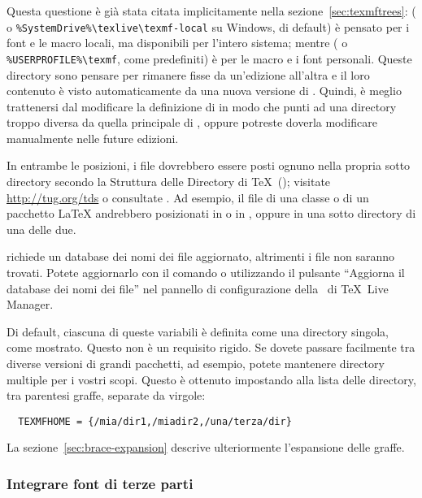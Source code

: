 \documentclass{article}
\begin{document}
Questa questione è già stata citata implicitamente nella
sezione~\ref{sec:texmftrees}:
 ( o
\verb|%SystemDrive%\texlive\texmf-local| su Windows, di default) è pensato
per i font e le macro locali, ma disponibili per l'intero sistema; mentre
 ( o \verb|%USERPROFILE%\texmf|,
come predefiniti) è per le macro e i font personali.%
Queste directory sono pensare per rimanere fisse da un'edizione all'altra
e il loro contenuto è visto automaticamente da una nuova versione di \TL.
Quindi, è meglio trattenersi dal modificare la definizione di
 in modo che punti ad una directory troppo diversa da
quella principale di \TL, oppure potreste doverla modificare manualmente
nelle future edizioni.

In entrambe le posizioni, i file dovrebbero essere posti ognuno nella
propria sotto directory secondo la Struttura delle Directory di \TeX\
(\TDS); visitate \url{http://tug.org/tds} o consultate
. Ad esempio, il file di una
classe o di un pacchetto \LaTeX{} andrebbero posizionati in
 o in , oppure
in una sotto directory di una delle due.

 richiede un database dei nomi dei file aggiornato,
altrimenti i file non saranno trovati. Potete aggiornarlo con il comando
\cmdname{mktexlsr} o utilizzando il pulsante ``Aggiorna il database dei
nomi dei file'' nel pannello di configurazione della \GUI\ di \TeX\ Live
Manager.

Di default, ciascuna di queste variabili è definita come una directory
singola, come mostrato. Questo non è un requisito rigido. Se dovete passare
facilmente tra diverse versioni di grandi pacchetti, ad esempio, potete
mantenere directory multiple per i vostri scopi. Questo è ottenuto
impostando \dirname{TEXMFHOME} alla lista delle directory, tra parentesi
graffe, separate da virgole:

\begin{verbatim}
  TEXMFHOME = {/mia/dir1,/miadir2,/una/terza/dir}
\end{verbatim}

La sezione~\ref{sec:brace-expansion} descrive ulteriormente l'espansione
delle graffe.


\subsubsection{Integrare font di terze parti}
\end{document}

